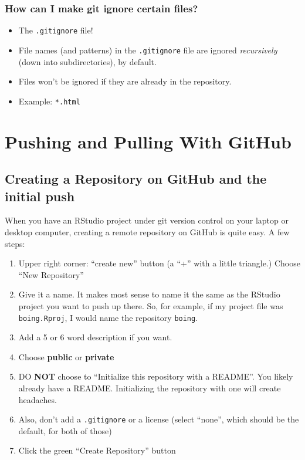 \documentclass[]{book}
\providecommand{\tightlist}{%
  \setlength{\itemsep}{0pt}\setlength{\parskip}{0pt}}
\theoremstyle{definition}
\theoremstyle{definition}
\theoremstyle{remark}
\begin{document}
\subsubsection{How can I make git ignore certain
files?}\label{how-can-i-make-git-ignore-certain-files}

\begin{itemize}
\tightlist
\item
  The \texttt{.gitignore} file!
\item
  File names (and patterns) in the \texttt{.gitignore} file are ignored
  \emph{recursively} (down into subdirectories), by default.
\item
  Files won't be ignored if they are already in the repository.
\item
  Example: \texttt{*.html}
\end{itemize}

\section{Pushing and Pulling With
GitHub}\label{pushing-and-pulling-with-github}

\subsection{Creating a Repository on GitHub and the initial
push}\label{creating-a-repository-on-github-and-the-initial-push}

When you have an RStudio project under git version control on your
laptop or desktop computer, creating a remote repository on GitHub is
quite easy. A few steps:

\begin{enumerate}
\def\labelenumi{\arabic{enumi}.}
\tightlist
\item
  Upper right corner: ``create new'' button (a ``+'' with a little
  triangle.) Choose ``New Repository''
\item
  Give it a name. It makes most sense to name it the same as the RStudio
  project you want to push up there. So, for example, if my project file
  was \texttt{boing.Rproj}, I would name the repository \texttt{boing}.
\item
  Add a 5 or 6 word description if you want.
\item
  Choose \textbf{public} or \textbf{private}
\item
  DO \textbf{NOT} choose to ``Initialize this repository with a
  README''. You likely already have a README. Initializing the
  repository with one will create headaches.
\item
  Also, don't add a \texttt{.gitignore} or a license (select ``none'',
  which should be the default, for both of those)
\item
  Click the green ``Create Repository'' button
\end{enumerate}
\end{document}
